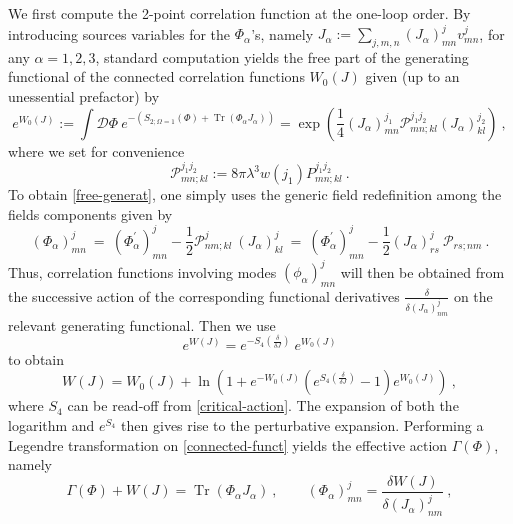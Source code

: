 \documentclass[a4paper,11pt,twoside]{article}
\numberwithin{equation}{section}
\DeclareMathOperator{\tr}{Tr}
\theoremstyle{nonumberplain}
\newcounter{and}
\begin{document}
We first compute the 2-point correlation function at the one-loop order. By introducing sources variables for the $\Phi_\alpha$'s, namely $J_\alpha := \underset{j,m,n}{\sum}(J_\alpha)^j_{mn}v^j_{mn}$, for any $\alpha=1,2,3$, standard computation yields the free part of the generating functional of the connected correlation functions $W_0(J)$ given (up to an unessential prefactor) by%
%
\begin{equation}
e^{W_0(J)} := \int\mathcal{D}\Phi \ e^{-(S_{2;\Omega=1}(\Phi)+\tr(\Phi_\alpha J_\alpha))} 
= \exp\left(\frac{1}{4} (J_\alpha)^{j_1}_{mn} \mathcal{P}^{j_1j_2}_{mn;kl} (J_\alpha)^{j_2}_{kl} \right) \ , \label{free-generat}
\end{equation}
%
where we set for convenience%
%
\begin{equation}
\mathcal{P}^{j_1j_2}_{mn;kl} := 8\pi\lambda^3 w(j_1) P^{j_1j_2}_{mn;kl} \ . \label{source}
\end{equation}
%
To obtain \eqref{free-generat}, one simply uses the generic field redefinition among the fields components given by%
%
\begin{equation*}
(\Phi_\alpha)^j_{mn} \ = \ (\Phi^\prime_\alpha)_{mn}^j - \frac12 \mathcal{P}^j_{nm;kl}\ (J_\alpha)^j_{kl} \ = \ (\Phi^\prime_\alpha)_{mn}^j - \frac12 (J_\alpha)^j_{rs} \ \mathcal{P}_{rs;nm} \ . 
\end{equation*}
%
Thus, correlation functions involving modes $(\phi_\alpha)^j_{mn}$ will then be obtained from the successive action of the corresponding functional derivatives $\frac{\delta}{\delta(J_\alpha)^j_{nm}}$ on the relevant generating functional. Then we use%
%
\begin{equation*}
e^{W(J)} = e^{-S_4\left(\frac{\delta}{\delta{J}}\right)} \ e^{W_0(J)}
\end{equation*}
%
to obtain%
%
\begin{equation}
W(J) = W_0(J) + \ln\left( 1 + e^{-W_0(J)} \left( e^{S_4\left(\frac{\delta}{\delta{J}}\right)} - 1 \right) e^{W_0(J)} \right) \ , \label{connected-funct}
\end{equation}
%
where $S_4$ can be read-off from \eqref{critical-action}. The expansion of both the logarithm and $e^{S_4}$ then gives rise to the perturbative expansion. Performing a Legendre transformation on \eqref{connected-funct} yields the effective action $\Gamma(\Phi)$, namely%
%
\begin{equation}
\Gamma(\Phi) + W(J) = \tr\left( \Phi_\alpha J_\alpha \right) \ , \qquad (\Phi_\alpha)^j_{mn} = \frac{\delta W(J)}{\delta(J_\alpha)^j_{nm}} \ , \label{legendre}
\end{equation}
\end{document}
